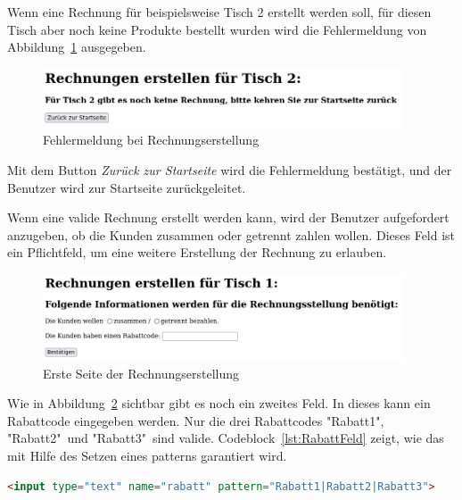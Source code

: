 Wenn eine Rechnung für beispielsweise Tisch 2 erstellt werden soll, für diesen Tisch aber noch keine Produkte bestellt wurden wird die Fehlermeldung von Abbildung~\ref{abb:RechnungFehler} ausgegeben.

\begin{figure}[htb]
  \centering
  \includegraphics[width=0.95\textwidth]{images/RechnungFehler.png}
  \caption[Fehlermeldung bei Rechnungserstellung]{Fehlermeldung bei Rechnungserstellung}
  \label{abb:RechnungFehler}
\end{figure}

Mit dem Button \textit{Zurück zur Startseite} wird die Fehlermeldung bestätigt, und der Benutzer wird zur Startseite zurückgeleitet.

Wenn eine valide Rechnung erstellt werden kann, wird der Benutzer aufgefordert anzugeben, ob die Kunden zusammen oder getrennt zahlen wollen.
Dieses Feld ist ein Pflichtfeld, um eine weitere Erstellung der Rechnung zu erlauben.

\begin{figure}[htb]
  \centering
  \includegraphics[width=0.95\textwidth]{images/InitialRechnung.png}
  \caption[Erste Seite der Rechnungserstellung]{Erste Seite der Rechnungserstellung}
  \label{abb:InitialRechnung}
\end{figure}

Wie in Abbildung~\ref{abb:InitialRechnung} sichtbar gibt es noch ein zweites Feld.
In dieses kann ein Rabattcode eingegeben werden.
Nur die drei Rabattcodes "Rabatt1", "Rabatt2"\ und "Rabatt3"\ sind valide.
Codeblock~\ref{lst:RabattFeld} zeigt, wie das mit Hilfe des Setzen eines patterns garantiert wird.

\begin{lstlisting}[language=html, caption=Eingabefeld für den Rabattcode, label=lst:RabattFeld]
  <input type="text" name="rabatt" pattern="Rabatt1|Rabatt2|Rabatt3">
\end{lstlisting}

